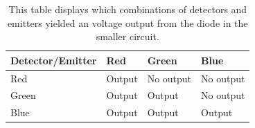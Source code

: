 \begin{table}[H]
    \centering
    \caption{This table displays which combinations of detectors and emitters yielded an voltage output from the diode in the smaller circuit.}
    \begin{tabular}{@{}llll@{}}
    \toprule
    Detector/Emitter & Red    & Green     & Blue      \\ \midrule
    Red              & Output & No output & No output \\
    Green            & Output & Output    & No output \\
    Blue             & Output & Output    & Output    \\ \bottomrule
    \end{tabular}
    \label{tab:part3}
\end{table}